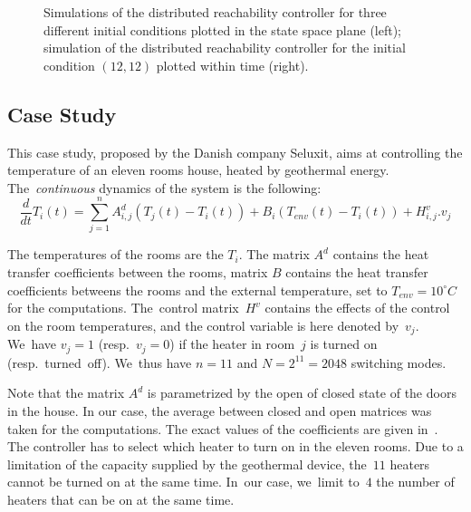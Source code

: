 \begin{example}
\begin{figure}[t]
  \caption{Simulations of the distributed reachability controller for three different initial conditions plotted
  in the state space plane (left); simulation of the distributed reachability controller for the initial condition $(12,12)$ plotted 
  within time (right).}
 \label{fig:simu_distri}
\end{figure}

% 
% 
 \end{example}


\subsection{Case Study}
\label{sec:case_study0}

This case study, proposed by the Danish company Seluxit, aims at controlling 
the temperature of an eleven rooms house, heated by geothermal energy.
The~\emph{continuous} dynamics of the system is the following:
\begin{equation}
 \frac{d}{dt} T_i(t) = \sum_{j=1}^n A_{i,j}^d (T_j(t) - T_i(t)) + B_i(T_{env} (t) - T_i(t)) + H_{i,j}^v.v_j 
\end{equation}



The temperatures of the rooms are the $T_i$.  The matrix $A^d$
contains the heat transfer coefficients between the rooms, matrix $B$
contains the heat transfer coefficients betweens the rooms and the
external temperature, set to ${T_{env} = 10^\circ C}$ for the
computations. The~control matrix~$H^v$ contains the effects of the
control on the room temperatures, and the control variable is here
denoted by~$v_j$. We~have $v_j = 1$ (resp.~$v_j = 0$) if the heater in
room~$j$ is turned on (resp.~turned~off). We~thus have $n=11$ and
$N=2^{11} = 2048$ switching modes.


Note that the matrix $A^d$ is parametrized by the open of closed state
of the doors in the house. In our case, the average between closed and
open matrices was taken for the computations. The exact values of the
coefficients are given in~\cite{larsen2015online}.  The controller has
to select which heater to turn on in the eleven rooms. Due to a
limitation of the capacity supplied by the geothermal device, the~$11$
heaters cannot be turned on at the same time.  In~our case, we~limit
to~$4$ the number of heaters that can be on at the same time.


